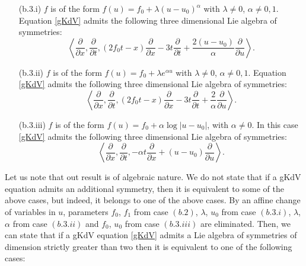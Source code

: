 \documentclass[
11pt,%
tightenlines,%
twoside,%
onecolumn,%
nofloats,%
nobibnotes,%
nofootinbib,%
superscriptaddress,%
noshowpacs,%
centertags]%
{revtex4}
\begin{document}
\begin{theorem}
\begin{itemize}
\begin{itemize}
\begin{itemize}
\item[(b.3.i)] $f$ is of the form 
$f(u) = f_0 + \lambda(u-u_0)^\alpha$
with $\lambda\neq 0$, $\alpha \neq 0,1$. Equation \eqref{gKdV} admits the following three dimensional Lie algebra of symmetries:
$$\left\langle \frac{\partial}{\partial x}, \frac{\partial}{\partial t}, (2f_0t-x)\frac{\partial}{\partial x}- 3t\frac{\partial}{\partial t}+ \frac{2(u-u_0)}{\alpha}\frac{\partial}{\partial u} \right\rangle.$$
\item[(b.3.ii)] $f$ is of the form 
$f(u) = f_0 + \lambda e^{\alpha u}$
with $\lambda\neq 0$, $\alpha \neq 0,1$. Equation \eqref{gKdV} admits the following three dimensional Lie algebra of symmetries:
$$\left\langle \frac{\partial}{\partial x}, \frac{\partial}{\partial t}, (2f_0t-x)\frac{\partial}{\partial x}- 3t\frac{\partial}{\partial t}+ \frac{2}{\alpha}\frac{\partial}{\partial u} \right\rangle.$$
\item[(b.3.iii)] $f$ is of the form $f(u) = f_0 + \alpha \log|u-u_0|$, with $\alpha\neq 0$. In this case \eqref{gKdV} admits the following three dimensional Lie algebra of symmetries:
$$\left\langle \frac{\partial}{\partial x}, \frac{\partial}{\partial t}, -\alpha t \frac{\partial}{\partial x}+(u-u_0)\frac{\partial}{\partial u} \right\rangle.$$
\end{itemize}
\end{itemize}
\end{itemize}
\end{theorem}

Let us note that out result is of algebraic nature. We do not state that if a gKdV equation admits an additional symmetry, then it is equivalent to some of the above cases, but indeed, it belongs to one of the above cases. By an affine change of variables in $u$, parameters $f_0$, $f_1$ from case $(b.2)$, $\lambda$, $u_0$ from case $(b.3.i)$, $\lambda$, $\alpha$ from case $(b.3.ii)$  and $f_0$, $u_0$ from case $(b.3.iii)$ are eliminated. Then, we can state that if a gKdV equation \eqref{gKdV} admits a Lie algebra of symmetries of dimension strictly greater than two then it is equivalent to one of the following cases:
\end{document}
